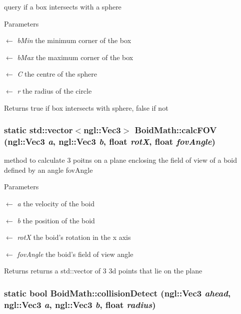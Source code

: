 query if a box intersects with a sphere 
\begin{DoxyParams}{Parameters}
\item[\mbox{$\leftarrow$} {\em bMin}]the minimum corner of the box \item[\mbox{$\leftarrow$} {\em bMax}]the maximum corner of the box \item[\mbox{$\leftarrow$} {\em C}]the centre of the sphere \item[\mbox{$\leftarrow$} {\em r}]the radius of the circle \end{DoxyParams}
\begin{DoxyReturn}{Returns}
true if box intersects with sphere, false if not 
\end{DoxyReturn}
\hypertarget{classBoidMath_ab1a1787cf7762f8193ef70b2b83a7416}{
\subsubsection[{calcFOV}]{\setlength{\rightskip}{0pt plus 5cm}static std::vector$<$ngl::Vec3$>$ BoidMath::calcFOV (ngl::Vec3 {\em a}, \/  ngl::Vec3 {\em b}, \/  float {\em rotX}, \/  float {\em fovAngle})}}
\label{classBoidMath_ab1a1787cf7762f8193ef70b2b83a7416}


method to calculate 3 poitns on a plane enclosing the field of view of a boid defined by an angle fovAngle 
\begin{DoxyParams}{Parameters}
\item[\mbox{$\leftarrow$} {\em a}]the velocity of the boid \item[\mbox{$\leftarrow$} {\em b}]the position of the boid \item[\mbox{$\leftarrow$} {\em rotX}]the boid's rotation in the x axis \item[\mbox{$\leftarrow$} {\em fovAngle}]the boid's field of view angle \end{DoxyParams}
\begin{DoxyReturn}{Returns}
returns a std::vector of 3 3d points that lie on the plane 
\end{DoxyReturn}
\hypertarget{classBoidMath_a4480da5f7efbf66fa658b82ba3258545}{
\subsubsection[{collisionDetect}]{\setlength{\rightskip}{0pt plus 5cm}static bool BoidMath::collisionDetect (ngl::Vec3 {\em ahead}, \/  ngl::Vec3 {\em a}, \/  ngl::Vec3 {\em b}, \/  float {\em radius})}}
\label{classBoidMath_a4480da5f7efbf66fa658b82ba3258545}


